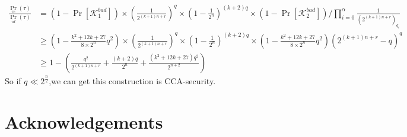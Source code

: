 \begin{align*}
\frac{\Pr_{re}(\tau)}{\Pr_{id}(\tau)}&= (1-\Pr[\mathcal{K}_{1}^{bad}])\times(\frac{1}{2^{(k+1)n+r}})^{q}\times(1-\frac{1}{2^{n}})^{(k+2)q}\times
(1-\Pr[\mathcal{K}_{2}^{bad}]) / \prod_{i=0}^{\alpha}\frac{1}{(2^{(k+1)n+r})_{q_{i}}}\\
&\geq (1-\frac{k^{2}+12k+27}{8\times2^{n}}q^{2})\times(\frac{1}{2^{(k+1)n+r}})^{q}\times(1-\frac{1}{2^{n}})^{(k+2)q}\times
(1-\frac{k^{2}+12k+27}{8\times2^{n}}q^{2})(2^{(k+1)n+r}-q)^{q}\\
&\geq 1-( \frac{q^{2}}{2^{(k+1)n+r}}+\frac{(k+2)q}{2^{n}} +\frac{(k^{2}+12k+27)q^{2}}{2^{n+2}})
\end{align*}
So if $q \ll 2^{\frac{n}{2}}$,we can get this construction is CCA-security.\\







\section*{Acknowledgements}




